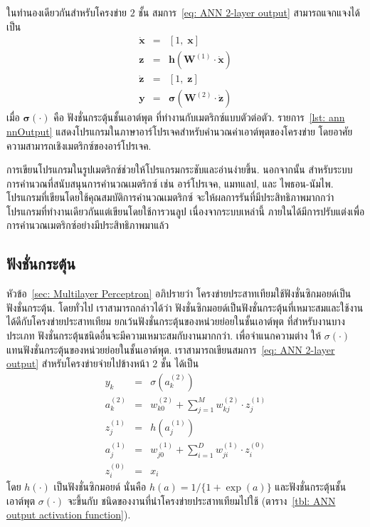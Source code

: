 ในทำนองเดียวกันสำหรับโครงข่าย $2$ ชั้น สมการ~\ref{eq: ANN 2-layer output} สามารถแจกแจงได้เป็น
\begin{eqnarray}
\mathbf{\dot{x}} &=& [1, \; \mathbf{x}]
\label{eq: ANN 2-layer x dot} \\
\mathbf{z} &=& \mathbf{h}( \mathbf{W}^{(1)} \cdot \mathbf{\dot{x}})
\label{eq: ANN 2-layer z} \\
\mathbf{\dot{z}} &=& [1, \; \mathbf{z}]
\label{eq: ANN 2-layer z dot} \\
\mathbf{y} &=& \bm{\sigma}( \mathbf{W}^{(2)} \cdot \mathbf{\dot{z}})
\label{eq: ANN 2-layer output matrix} 
\end{eqnarray}
เมื่อ $\bm{\sigma}(\cdot)$ คือ ฟังชั่นกระตุ้นชั้นเอาต์พุต ที่ทำงานกับเมตริกซ์แบบตัวต่อตัว.
รายการ~\ref{lst: ann nnOutput} แสดงโปรแกรมในภาษาอาร์โปรเจคสำหรับคำนวณค่าเอาต์พุตของโครงข่าย
โดยอาศัยความสามารถเชิงเมตริกซ์ของอาร์โปรเจค.

{\small
\begin{shaded}
การเขียนโปรแกรมในรูปเมตริกซ์ช่วยให้โปรแกรมกระชับและอ่านง่ายขึ้น.
นอกจากนั้น
สำหรับระบบการคำนวณที่สนับสนุนการคำนวณเมตริกซ์ เช่น อาร์โปรเจค, แมทแลป, และ ไพธอน-นัมไพ.
โปรแกรมที่เขียนโดยใช้คุณสมบัติการคำนวณเมตริกซ์ 
จะให้ผลการรันที่มีประสิทธิภาพมากกว่าโปรแกรมที่ทำงานเดียวกันแต่เขียนโดยใช้การวนลูป
เนื่องจากระบบเหล่านี้ ภายในได้มีการปรับแต่งเพื่อการคำนวณเมตริกซ์อย่างมีประสิทธิภาพมาแล้ว
\end{shaded}
}

\subsection{ฟังชั่นกระตุ้น}
\label{sec: ANN Activation Function}

หัวข้อ~\ref{sec: Multilayer Perceptron} อภิปรายว่า โครงข่ายประสาทเทียมใช้ฟังชั่นซิกมอยด์เป็นฟังชั่นกระตุ้น.
โดยทั่วไป เราสามารถกล่าวได้ว่า ฟังชั่นซิกมอยด์เป็นฟังชั่นกระตุ้นที่เหมาะสมและใช้งานได้ดีกับโครงข่ายประสาทเทียม
ยกเว้นฟังชั่นกระตุ้นของหน่วยย่อยในชั้นเอาต์พุต ที่สำหรับงานบางประเภท ฟังชั่นกระตุ้นชนิดอื่นจะมีความเหมาะสมกับงานมากกว่า.
เพื่อจำแนกความต่าง ให้ $\sigma(\cdot)$ แทนฟังชั่นกระตุ้นของหน่วยย่อยในชั้นเอาต์พุต.
เราสามารถเขียนสมการ~\ref{eq: ANN 2-layer output} สำหรับโครงข่ายจ่ายไปข้างหน้า $2$ ชั้น ได้เป็น
\begin{eqnarray}
   y_k &=& \sigma( a^{(2)}_k )
\label{eq: ANN 2-layer network output} \\
   a^{(2)}_k &=& w^{(2)}_{k0} + \sum_{j=1}^M w^{(2)}_{kj} \cdot z^{(1)}_j
\label{eq: ANN 2-layer activation 2} \\  
   z^{(1)}_j &=& h( a^{(1)}_j )
\label{eq: ANN 2-layer output 1} \\  
   a^{(1)}_j &=& w^{(1)}_{j0} + \sum_{i=1}^D w^{(1)}_{ji} \cdot z^{(0)}_i
\label{eq: ANN 2-layer activation 1} \\     
   z^{(0)}_i &=& x_i
\label{eq: ANN 2-layer network input}
\end{eqnarray}
โดย $h(\cdot)$ เป็นฟังชั่นซิกมอยด์ นั่นคือ $h(a) = 1/\{1 + \exp(a)\}$ 
และฟังชั่นกระตุ้นชั้นเอาต์พุต $\sigma(\cdot)$ 
จะขึ้นกับ ชนิดของงานที่นำโครงข่ายประสาทเทียมไปใช้ (ตาราง~\ref{tbl: ANN output activation function}).

